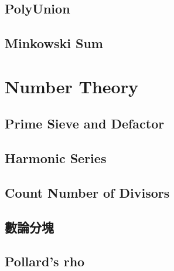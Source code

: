 \documentclass[a4paper,10pt,twocolumn,oneside]{article}
\begin{document}
\subsection{PolyUnion}


% 

\subsection{Minkowski Sum}







\section{Number Theory}

%

\subsection{Prime Sieve and Defactor}


\subsection{Harmonic Series}


\subsection{Count Number of Divisors}


\subsection{數論分塊}



\subsection{Pollard's rho}


\end{document}
